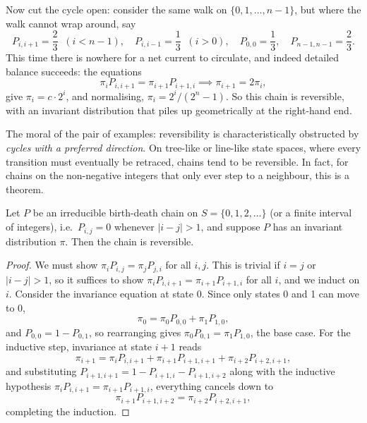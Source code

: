 \begin{example}
	Now cut the cycle open: consider the same walk on $\{0, 1, \dots, n - 1\}$, but where the walk cannot wrap around, say
	$$
	P_{i, i + 1} = \frac{2}{3} \;\; (i < n - 1), \quad P_{i, i - 1} = \frac{1}{3} \;\; (i > 0), \quad P_{0, 0} = \frac{1}{3}, \quad P_{n - 1, n - 1} = \frac{2}{3}.
	$$
	This time there is nowhere for a net current to circulate, and indeed detailed balance succeeds: the equations
	$$
	\pi_i P_{i, i + 1} = \pi_{i + 1}P_{i + 1, i} \implies \pi_{i + 1} = 2\pi_i,
	$$
	give $\pi_i = c \cdot 2^i$, and normalising, $\pi_i = 2^i / (2^n - 1)$. So this chain is reversible, with an invariant distribution that piles up geometrically at the right-hand end.
\end{example}

The moral of the pair of examples: reversibility is characteristically obstructed by \emph{cycles with a preferred direction}. On tree-like or line-like state spaces, where every transition must eventually be retraced, chains tend to be reversible. In fact, for chains on the non-negative integers that only ever step to a neighbour, this is a theorem.

\begin{proposition}
	Let $P$ be an irreducible birth-death chain on $S = \{0, 1, 2, \dots\}$ (or a finite interval of integers), i.e.\ $P_{i, j} = 0$ whenever $|i - j| > 1$, and suppose $P$ has an invariant distribution $\pi$. Then the chain is reversible.
\end{proposition}
\begin{proof}
	We must show $\pi_i P_{i, j} = \pi_j P_{j, i}$ for all $i, j$. This is trivial if $i = j$ or $|i - j| > 1$, so it suffices to show $\pi_i P_{i, i + 1} = \pi_{i + 1}P_{i + 1, i}$ for all $i$, and we induct on $i$. Consider the invariance equation at state 0. Since only states 0 and 1 can move to 0,
	$$
	\pi_0 = \pi_0 P_{0, 0} + \pi_1 P_{1, 0},
	$$
	and $P_{0, 0} = 1 - P_{0, 1}$, so rearranging gives $\pi_0 P_{0, 1} = \pi_1 P_{1, 0}$, the base case. For the inductive step, invariance at state $i + 1$ reads
	$$
	\pi_{i + 1} = \pi_i P_{i, i + 1} + \pi_{i + 1}P_{i + 1, i + 1} + \pi_{i + 2}P_{i + 2, i + 1},
	$$
	and substituting $P_{i + 1, i + 1} = 1 - P_{i + 1, i} - P_{i + 1, i + 2}$ along with the inductive hypothesis $\pi_i P_{i, i + 1} = \pi_{i + 1}P_{i + 1, i}$, everything cancels down to
	$$
	\pi_{i + 1}P_{i + 1, i + 2} = \pi_{i + 2}P_{i + 2, i + 1},
	$$
	completing the induction.
\end{proof}


